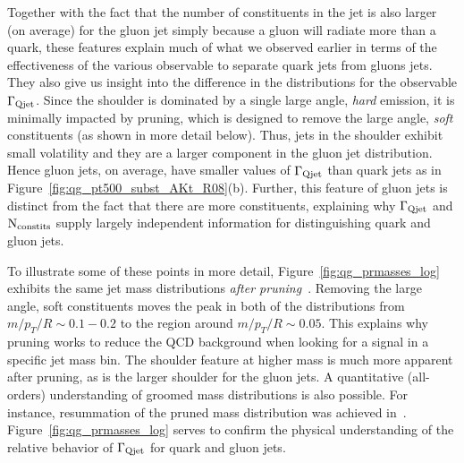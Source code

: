  
Together with  the fact that the number of constituents in the jet is also larger (on average) for the gluon jet simply because a gluon will radiate more than a quark, these features explain much of what we observed earlier in terms of the effectiveness of the various observable to separate quark jets from gluons jets. They also give us insight into the difference in the distributions for the observable 
$\Gamma_{\rm Qjet}$. Since the shoulder is dominated by a single large angle, \textit{hard} emission, it is minimally impacted by pruning,
which is designed to remove the large angle, \textit{soft} constituents (as shown in more detail below). Thus, jets in the shoulder exhibit small volatility and they are a larger
component in the gluon jet distribution.  Hence gluon jets, on average, have smaller values of  $\Gamma_{\rm Qjet}$ than quark jets as in 
Figure~\ref{fig:qg_pt500_subst_AKt_R08}(b).  Further, this feature of gluon jets is distinct from the fact that there are more constituents, explaining why
$\Gamma_{\rm Qjet}$ and $\rm{N_ {constits}}$ supply largely independent information for distinguishing quark and gluon jets. 

To illustrate some of these points in more detail, Figure~\ref{fig:qg_prmasses_log} exhibits the same jet mass distributions  
\textit{after pruning}~\cite{Ellis:2009me,Ellis:2009su}.  Removing the large angle,  soft constituents
moves the peak in both of the distributions from  $m/p_T/R \sim 0.1 - 0.2$ to the region around $m/p_T/R \sim 0.05$.  This explains why pruning works to reduce the
QCD background when looking for a signal in a specific jet mass bin.  The shoulder feature at higher mass is much more apparent after pruning, as is the larger shoulder for
the gluon jets.  A quantitative (all-orders) understanding of groomed mass distributions is also possible. For instance, resummation of the pruned mass distribution was achieved in~\cite{Dasgupta:2013ihk,Dasgupta:2013via}. Figure~\ref{fig:qg_prmasses_log} serves to confirm the physical understanding of the relative behavior of $\Gamma_{\rm Qjet}$ for quark and gluon jets.

